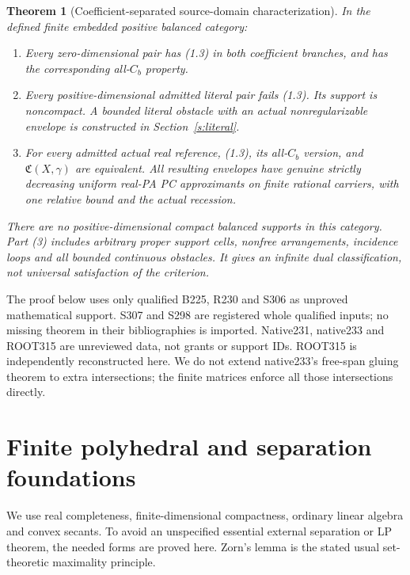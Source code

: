 \documentclass[11pt]{article}
\newtheorem{theorem}{Theorem}[section]
\begin{document}
\begin{theorem}[Coefficient-separated source-domain characterization]\label{t:main}
In the defined finite embedded positive balanced category:
\begin{enumerate}
\item Every zero-dimensional pair has (1.3) in both coefficient branches, and has the corresponding all-$C_b$ property.
\item Every positive-dimensional admitted literal pair fails (1.3). Its support is noncompact. A bounded literal obstacle with an actual nonregularizable envelope is constructed in Section~\ref{s:literal}.
\item For every admitted actual real reference, (1.3), its all-$C_b$ version, and $\mathfrak C(X,\gamma)$ are equivalent. All resulting envelopes have genuine strictly decreasing uniform real-PA PC approximants on finite rational carriers, with one relative bound and the actual recession.
\end{enumerate}
There are no positive-dimensional compact balanced supports in this category. Part (3) includes arbitrary proper support cells, nonfree arrangements, incidence loops and all bounded continuous obstacles. It gives an infinite dual classification, not universal satisfaction of the criterion.
\end{theorem}
The proof below uses only qualified B225, R230 and S306 as unproved mathematical support. S307 and S298 are registered whole qualified inputs; no missing theorem in their bibliographies is imported. Native231, native233 and ROOT315 are unreviewed data, not grants or support IDs. ROOT315 is independently reconstructed here. We do not extend native233's free-span gluing theorem to extra intersections; the finite matrices enforce all those intersections directly.

\section{Finite polyhedral and separation foundations}
We use real completeness, finite-dimensional compactness, ordinary linear algebra and convex secants. To avoid an unspecified essential external separation or LP theorem, the needed forms are proved here. Zorn's lemma is the stated usual set-theoretic maximality principle.
\end{document}
